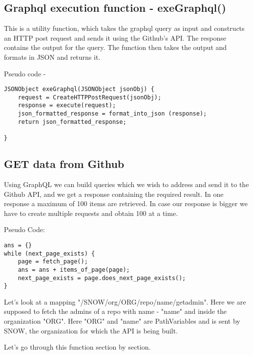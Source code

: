 \subsection{Graphql execution function - exeGraphql()}
This is a utility function, which takes the graphql query as input and constructs an HTTP post request and sends it using the Github's API. The response contains the output for the query. The function then takes the output and formats in JSON and returns it.

Pseudo code - 
\begin{lstlisting}[breaklines]
JSONObject exeGraphql(JSONObject jsonObj) {
	request = CreateHTTPPostRequest(jsonObj);
	response = execute(request);
	json_formatted_response = format_into_json (response);
	return json_formatted_response;
	
}
\end{lstlisting}


\subsection{GET data from Github}
Using GraphQL we can build queries which we wish to address and send it to the Github API, and we get a response containing the required result. In one response a maximum of 100 items are retrieved. In case our response is bigger we have to create multiple requests and obtain 100 at a time.

Pseudo Code:
\begin{lstlisting}[breaklines]
ans = {}
while (next_page_exists) {
	page = fetch_page();
	ans = ans + items_of_page(page);
	next_page_exists = page.does_next_page_exists();
}
\end{lstlisting}

Let's look at a mapping "/SNOW/org/{ORG}/repo/{name}/getadmin". Here we are supposed to fetch the admins of a repo with name - "name" and inside the organization "ORG". Here "ORG" and "name" are PathVariables and is sent by SNOW, the organization for which the API is being built.

Let's go through this function section by section.

